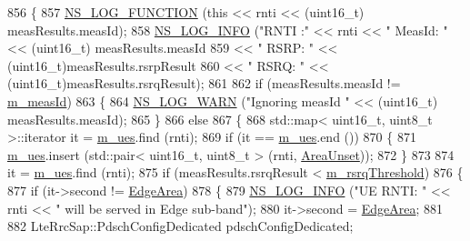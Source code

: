 \begin{DoxyCode}
856 \{
857   \hyperlink{log-macros-disabled_8h_a90b90d5bad1f39cb1b64923ea94c0761}{NS\_LOG\_FUNCTION} (\textcolor{keyword}{this} << rnti << (uint16\_t) measResults.measId);
858   \hyperlink{group__logging_gafbd73ee2cf9f26b319f49086d8e860fb}{NS\_LOG\_INFO} (\textcolor{stringliteral}{"RNTI :"} << rnti << \textcolor{stringliteral}{" MeasId: "} << (uint16\_t) measResults.measId
859                         << \textcolor{stringliteral}{" RSRP: "} << (uint16\_t)measResults.rsrpResult
860                         << \textcolor{stringliteral}{" RSRQ: "} << (uint16\_t)measResults.rsrqResult);
861 
862   \textcolor{keywordflow}{if} (measResults.measId != \hyperlink{classns3_1_1LteFfrEnhancedAlgorithm_a219f2bfef31d829479617ae18ef2d53f}{m\_measId})
863     \{
864       \hyperlink{group__logging_gade7208b4009cdf0e25783cd26766f559}{NS\_LOG\_WARN} (\textcolor{stringliteral}{"Ignoring measId "} << (uint16\_t) measResults.measId);
865     \}
866   \textcolor{keywordflow}{else}
867     \{
868       std::map< uint16\_t, uint8\_t >::iterator it = \hyperlink{classns3_1_1LteFfrEnhancedAlgorithm_adac3233d5e9a87d83e6179f02f4f6d46}{m\_ues}.find (rnti);
869       \textcolor{keywordflow}{if} (it == \hyperlink{classns3_1_1LteFfrEnhancedAlgorithm_adac3233d5e9a87d83e6179f02f4f6d46}{m\_ues}.end ())
870         \{
871           \hyperlink{classns3_1_1LteFfrEnhancedAlgorithm_adac3233d5e9a87d83e6179f02f4f6d46}{m\_ues}.insert (std::pair< uint16\_t, uint8\_t > (rnti, \hyperlink{classns3_1_1LteFfrEnhancedAlgorithm_a743d5d1934dc49e7c88a2850f624e6c3ad8d4a3dcc89aa9fe95bcb7349e8f06dc}{AreaUnset}));
872         \}
873 
874       it = \hyperlink{classns3_1_1LteFfrEnhancedAlgorithm_adac3233d5e9a87d83e6179f02f4f6d46}{m\_ues}.find (rnti);
875       \textcolor{keywordflow}{if} (measResults.rsrqResult < \hyperlink{classns3_1_1LteFfrEnhancedAlgorithm_abc46da1b7fd36b05250bd7b6e10c814e}{m\_rsrqThreshold})
876         \{
877           \textcolor{keywordflow}{if} (it->second != \hyperlink{classns3_1_1LteFfrEnhancedAlgorithm_a743d5d1934dc49e7c88a2850f624e6c3a2cb214dc1035d1d17b954464601f7a3e}{EdgeArea})
878             \{
879               \hyperlink{group__logging_gafbd73ee2cf9f26b319f49086d8e860fb}{NS\_LOG\_INFO} (\textcolor{stringliteral}{"UE RNTI: "} << rnti << \textcolor{stringliteral}{" will be served in Edge sub-band"});
880               it->second = \hyperlink{classns3_1_1LteFfrEnhancedAlgorithm_a743d5d1934dc49e7c88a2850f624e6c3a2cb214dc1035d1d17b954464601f7a3e}{EdgeArea};
881 
882               LteRrcSap::PdschConfigDedicated pdschConfigDedicated;

\end{DoxyCode}
